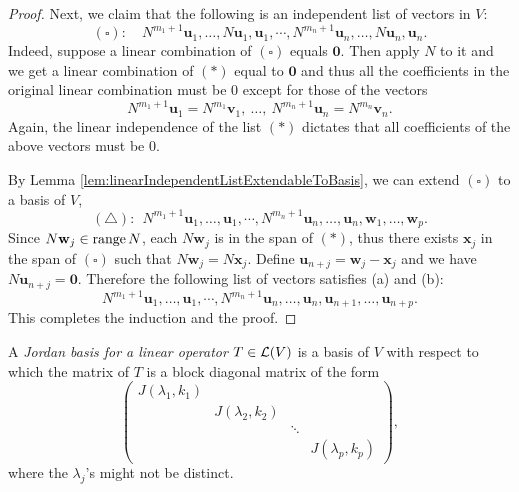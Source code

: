 \begin{proof}
  Next, we claim that
  the following is an independent list of vectors in $V$:
  \begin{displaymath}
    (\square):\quad N^{m_1+1}\mathbf{u}_1, \ldots, N\mathbf{u}_1, \mathbf{u}_1,
    \cdots, N^{m_n+1}\mathbf{u}_n, \ldots, N\mathbf{u}_n, \mathbf{u}_n.
  \end{displaymath}
  Indeed, suppose a linear combination of $(\square)$ equals
  $\mathbf{0}$.
  Then apply $N$ to it and we get a linear combination of $(*)$
  equal to $\mathbf{0}$ and thus all the coefficients
  in the original linear combination must be 0 except for
  those of the vectors
  \begin{displaymath}
    N^{m_1+1}\mathbf{u}_1=N^{m_1}\mathbf{v}_1,\
    \ldots,\  N^{m_n+1}\mathbf{u}_n=N^{m_n}\mathbf{v}_n.
  \end{displaymath}
  Again, the linear independence of the list $(*)$ dictates
  that all coefficients of the above vectors must be 0.

  By Lemma \ref{lem:linearIndependentListExtendableToBasis},
  we can extend $(\square)$ to a basis of $V$, 
  \begin{displaymath}
    (\triangle):\ \ N^{m_1+1}\mathbf{u}_1, \ldots, \mathbf{u}_1,
    \cdots, N^{m_n+1}\mathbf{u}_n, \ldots, \mathbf{u}_n,
    \mathbf{w}_1, \ldots, \mathbf{w}_p.
  \end{displaymath}
  Since $N \mathbf{w}_j\in \mathrm{range}\,N$,
  each $N\mathbf{w}_j$ is in the span of $(*)$,
  thus there exists $\mathbf{x}_j$ in the span of $(\square)$
  such that \mbox{$N\mathbf{w}_j=N \mathbf{x}_j$}.
%  
  Define $\mathbf{u}_{n+j}=\mathbf{w}_j-\mathbf{x}_j$
  and we have $N \mathbf{u}_{n+j} = \mathbf{0}$.
  Therefore the following list of vectors
  satisfies (a) and (b):
  \begin{displaymath}
    N^{m_1+1}\mathbf{u}_1, \ldots, \mathbf{u}_1,
    \cdots, N^{m_n+1}\mathbf{u}_n, \ldots, \mathbf{u}_n,
    \mathbf{u}_{n+1}, \ldots, \mathbf{u}_{n+p}.
  \end{displaymath}
  This completes the induction and the proof.
\end{proof}

\begin{defn}
  \label{def:JordanBasis}
  A \emph{Jordan basis for a linear operator} $T\in {\cal L}(V)$
  is a basis of $V$ with respect to which
  the matrix of $T$ is a block diagonal matrix of the form
  \begin{equation}
    \label{eq:JordanBasis}
    \begin{pmatrix}
      J(\lambda_1,k_1) & & & \\
      & J(\lambda_2,k_2) & \\
      & & \ddots & \\
      & & & J(\lambda_p,k_p) 
    \end{pmatrix},
  \end{equation}
  where %
  the $\lambda_j$'s might not be distinct.
\end{defn}

